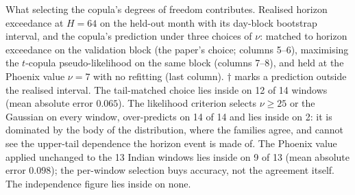 \begin{table}[t]
\caption{What selecting the copula's degrees of freedom contributes. Realised horizon exceedance at $H=64$ on the held-out month with its day-block bootstrap interval, and the copula's prediction under three choices of $\nu$: matched to horizon exceedance on the validation block (the paper's choice; columns 5--6), maximising the $t$-copula pseudo-likelihood on the same block (columns 7--8), and held at the Phoenix value $\nu=7$ with no refitting (last column). $\dagger$ marks a prediction outside the realised interval. The tail-matched choice lies inside on 12 of 14 windows (mean absolute error $0.065$). The likelihood criterion selects $\nu \geq 25$ or the Gaussian on every window, over-predicts on 14 of 14 and lies inside on 2: it is dominated by the body of the distribution, where the families agree, and cannot see the upper-tail dependence the horizon event is made of. The Phoenix value applied unchanged to the 13 Indian windows lies inside on 9 of 13 (mean absolute error $0.098$); the per-window selection buys accuracy, not the agreement itself. The independence figure lies inside on none.}
\label{tab:copula-df}
\end{table}
